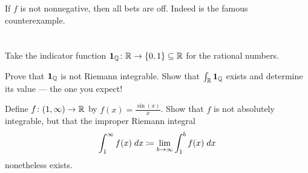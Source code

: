 If $f$ is not nonnegative, then all bets are off.
Indeed  is the famous counterexample.

\section{\problemhead}

\begin{sproblem}
	\label{prob:1QQ}
	Take the indicator function
	$\mathbf 1_{\mathbb Q} \colon \mathbb R \to \{0,1\} \subseteq \mathbb R$
	for the rational numbers.
		\begin{enumerate}[(a)]
	   \ii Prove that $\mathbf{1}_\mathbb Q$ is not Riemann integrable.
	   \ii Show that $\int_\mathbb R \mathbf{1}_\mathbb Q$ exists
	   and determine its value --- the one you expect!
   \end{enumerate}
\end{sproblem}

\begin{dproblem}
	\label{prob:sin_improper}
	Define $f \colon (1,\infty) \to \mathbb R$ by $f(x) = \frac{\sin(x)}{x}$.
	Show that $f$ is not absolutely integrable,
	but that the improper Riemann integral
	\[ \int_1^\infty f(x) \; dx \coloneqq
		\lim_{b \to \infty}
		\int_1^b f(x) \; dx \]
	nonetheless exists.
\end{dproblem}
